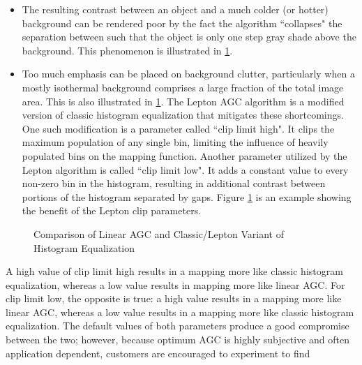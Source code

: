 \begin{itemize}
    \item The resulting contrast between an object and a much colder (or hotter)
background can be rendered poor by the fact the algorithm ``collapses" the
separation between such that the object is only one step gray shade above the
background. This phenomenon is illustrated in \ref{fig:comparisionlinearAGC}.
    \item Too much emphasis can be placed on background clutter, particularly
when a mostly isothermal background comprises a large fraction of the total
image area. This is also illustrated in \ref{fig:comparisionlinearAGC}. The
Lepton AGC algorithm is a modified version of classic histogram equalization
that mitigates these shortcomings. One such modification is a parameter called
``clip limit high". It clips the maximum population of any single bin, limiting
the influence of heavily populated bins on the mapping function. Another
parameter utilized by the Lepton algorithm is called ``clip limit low". It adds
a constant value to every non-zero bin in the histogram, resulting in additional
contrast between portions of the histogram separated by gaps. Figure
\ref{fig:comparisionlinearAGC} is an example showing the benefit of the Lepton
clip parameters.
%
\end{itemize}
\begin{figure}[!h]
    \centering
     \quad
     \quad
    \caption{Comparison of Linear AGC and Classic/Lepton Variant of Histogram Equalization}
    \label{fig:comparisionlinearAGC}
\end{figure}
%
A high value of clip limit high results in a mapping more like classic histogram
equalization, whereas a low value results in mapping more like linear AGC. For
clip limit low, the opposite is true: a high value results in a mapping more
like linear AGC, whereas a low value results in a mapping more like classic
histogram equalization. The default values of both parameters produce a good
compromise between the two; however, because optimum AGC is highly subjective
and often application dependent, customers are encouraged to experiment to find
